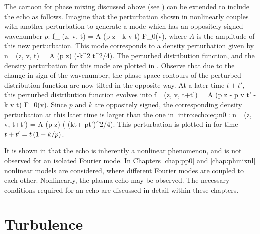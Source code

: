      The cartoon for phase mixing discussed above (see
     ) can
     be extended to include the echo as follows.
     Imagine that the perturbation shown in  nonlinearly couples with
     another perturbation to generate
     a mode which has an oppositely signed wavenumber $p$:
     \beq
        \delta f_{} (z, v, t) = A \cos(p z - k v t) F_0(v),
     \eeq
     where $A$ is the amplitude of this new perturbation. This mode corresponds to a density
     perturbation given by
     \beq
        \delta n_{} (z, v, t) = A \cos(p z) \exp\lt(-k^2 t^2/4\rt).
        \label{intro:echo:eq:n0}
     \eeq
     The perturbed distribution function, and the density perturbation for this mode are
     plotted in . Observe that due to the change in sign of the
     wavenumber, the phase space contours of the perturbed distribution function are now tilted in the opposite way.
     At a later time $t+t'$, this perturbed distribution function evolves into
     \beq
        \delta f_{} (z, v, t+t') = A \cos(p z - p v t' - k v t) F_0(v).
     \eeq
     Since $p$ and $k$ are oppositely signed, the corresponding density perturbation
     at this later time is larger than the one in \eqref{intro:echo:eq:n0}:
     \beq
        \delta n_{} (z, v, t+t') = A \cos(p z) \exp\lt(-(kt+ pt')^2/4\rt).
     \eeq
     This perturbation is plotted in  for time
     $t+t'=t\left(1-k/p\right)$. 

     It is shown in  that the echo is inherently a nonlinear phenomenon, and is
     not observed for an isolated Fourier mode. In Chapters \ref{chap:pp0} and
     \ref{chap:phmixnl} nonlinear models are considered, where different Fourier modes are
     coupled to each other. Nonlinearly, the plasma echo may be observed.
     The necessary conditions required for an echo are discussed in detail within these chapters.
     

     \section{Turbulence}
     \label{intro:sec:turb}

